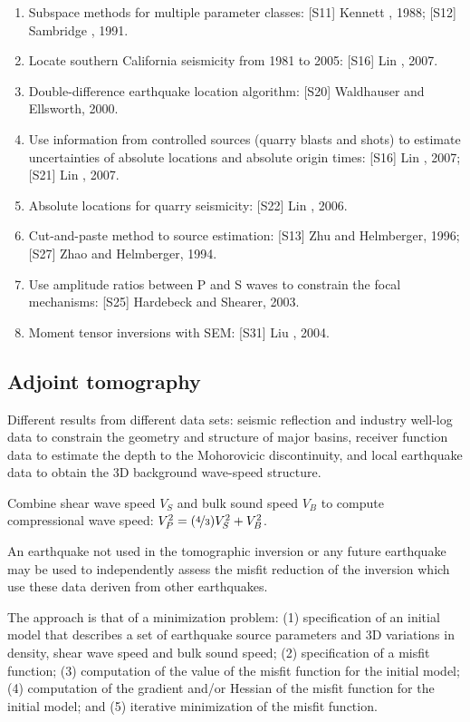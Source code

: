 \begin{enumerate}[\hspace{10mm}*]
    \item Subspace methods for multiple parameter classes: [S11] Kennett \etal, 1988; [S12] Sambridge \etal, 1991.
    \item Locate southern California seismicity from 1981 to 2005: [S16] Lin \etal, 2007.
    \item Double-difference earthquake location algorithm: [S20] Waldhauser and Ellsworth, 2000.
    \item Use information from controlled sources (quarry blasts and shots) to estimate uncertainties of absolute locations and absolute origin times: [S16] Lin \etal, 2007; [S21] Lin \etal, 2007.
    \item Absolute locations for quarry seismicity: [S22] Lin \etal, 2006.
    \item Cut-and-paste method to source estimation: [S13] Zhu and Helmberger, 1996; [S27] Zhao and Helmberger, 1994.
    \item Use amplitude ratios between P and S waves to constrain the focal mechanisms: [S25] Hardebeck and Shearer, 2003.
    \item Moment tensor inversions with SEM: [S31] Liu \etal, 2004.
\end{enumerate}\par
\subsection{Adjoint tomography}
Different results from different data sets: seismic reflection and industry well-log data to constrain the geometry and structure of major basins, receiver function data to estimate the depth to the Mohorovicic discontinuity, and local earthquake data to obtain the 3D background wave-speed structure.\par
Combine shear wave speed $V_S$ and bulk sound speed $V_B$ to compute compressional wave speed: $V_P^2=(\nicefrac{4}{3})V_S^2+V_B^2$.\par
An earthquake not used in the tomographic inversion or any future earthquake may be used to independently assess the misfit reduction of the inversion which use these data deriven from other earthquakes.\par
The approach is that of a minimization problem: (1) specification of an initial model that describes a set of earthquake source parameters and 3D variations in density, shear wave speed and bulk sound speed; (2) specification of a misfit function; (3) computation of the value of the misfit function for the initial model; (4) computation of the gradient and/or Hessian of the misfit function for the initial model; and (5) iterative minimization of the misfit function.\par
